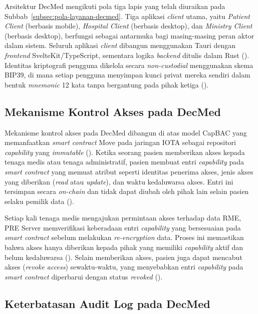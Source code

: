Arsitektur DecMed mengikuti pola tiga lapis yang telah diuraikan pada
Subbab~\ref{subsec:pola-layanan-decmed}. Tiga aplikasi \textit{client}
utama, yaitu \textit{Patient Client} (berbasis mobile),
\textit{Hospital Client} (berbasis desktop), dan \textit{Ministry
Client} (berbasis desktop), berfungsi sebagai antarmuka bagi
masing-masing peran aktor dalam sistem. Seluruh aplikasi
\textit{client} dibangun menggunakan Tauri dengan \textit{frontend}
SvelteKit/TypeScript, sementara logika \textit{backend} ditulis dalam
Rust (\cite{DecMed}). Identitas kriptografi pengguna dikelola secara
\textit{non-custodial} menggunakan skema BIP39, di mana setiap
pengguna menyimpan kunci privat mereka sendiri dalam bentuk
\textit{mnemonic} 12 kata tanpa bergantung pada pihak ketiga
(\cite{DecMed}).

\subsection{Mekanisme Kontrol Akses pada DecMed}
\label{subsec:decmed-kontrol-akses}

Mekanisme kontrol akses pada DecMed dibangun di atas model CapBAC
yang memanfaatkan \textit{smart contract} Move pada jaringan IOTA
sebagai repositori \textit{capability} yang \textit{immutable}
(\cite{DecMed}). Ketika seorang pasien memberikan akses kepada tenaga
medis atau tenaga administratif, pasien membuat entri
\textit{capability} pada \textit{smart contract} yang memuat atribut
seperti identitas penerima akses, jenis akses yang diberikan
(\textit{read} atau \textit{update}), dan waktu kedaluwarsa akses.
Entri ini tersimpan secara \textit{on-chain} dan tidak dapat diubah
oleh pihak lain selain pasien selaku pemilik data (\cite{DecMed}).

Setiap kali tenaga medis mengajukan permintaan akses terhadap data RME,
PRE Server memverifikasi keberadaan entri \textit{capability} yang
bersesuaian pada \textit{smart contract} sebelum melakukan
\textit{re-encryption} data. Proses ini memastikan bahwa akses hanya
diberikan kepada pihak yang memiliki \textit{capability} aktif dan
belum kedaluwarsa (\cite{DecMed}). Selain memberikan akses, pasien
juga dapat mencabut akses (\textit{revoke access}) sewaktu-waktu, yang
menyebabkan entri \textit{capability} pada \textit{smart contract}
diperbarui dengan status \textit{revoked} (\cite{DecMed}).

\subsection{Keterbatasan Audit Log pada DecMed}
\label{subsec:decmed-keterbatasan-audit}


